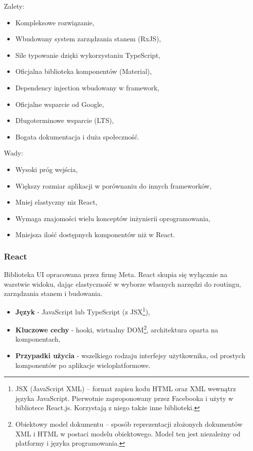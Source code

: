 Zalety:
\begin{itemize}
	\item Kompleksowe rozwiązanie,
	\item Wbudowany system zarządzania stanem (RxJS),
	\item Sile typowanie dzięki wykorzystaniu TypeScript,
	\item Oficjalna biblioteka komponentów (Material),
	\item Dependency injection wbudowany w framework,
	\item Oficjalne wsparcie od Google,
	\item Długoterminowe wsparcie (LTS),
	\item Bogata dokumentacja i duża społeczność.
\end{itemize}

Wady:
\begin{itemize}
	\item Wysoki próg wejścia,
	\item Większy rozmiar aplikacji w porównaniu do innych frameworków,
	\item Mniej elastyczny niz React,
	\item Wymaga znajomości wielu konceptów inżynierii oprogramowania,
	\item Mniejsza ilość dostępnych komponentów niż w React.
\end{itemize}

\subsubsection{React}
Biblioteka UI opracowana przez firmę Meta. React skupia się wyłącznie na warstwie widoku, dając elastyczność w wyborze własnych narzędzi do routingu, zarządzania stanem i budowania.

\begin{itemize}
	\item \textbf{Język} - JavaScript lub TypeScript (z JSX\footnote{JSX (JavaScript XML) – format zapisu kodu HTML oraz XML wewnątrz języka JavaScript. Pierwotnie zaproponowany przez Facebooka i użyty w bibliotece React.js. Korzystają z niego także inne biblioteki.}),
	\item \textbf{Kluczowe cechy} - hooki, wirtualny DOM\footnote{Obiektowy model dokumentu – sposób reprezentacji złożonych dokumentów XML i HTML w postaci modelu obiektowego. Model ten jest niezależny od platformy i języka programowania.}, architektura oparta na komponentach,
	\item \textbf{Przypadki użycia} - wszelkiego rodzaju interfejsy użytkownika, od prostych komponentów po aplikacje wieloplatformowe.
\end{itemize}


